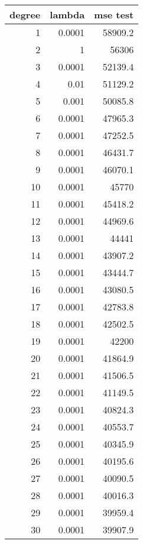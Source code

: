 \begin{tabular}{rrr}
\hline
   degree &   lambda &   mse test \\
\hline
        1 &   0.0001 &    58909.2 \\
        2 &   1      &    56306   \\
        3 &   0.0001 &    52139.4 \\
        4 &   0.01   &    51129.2 \\
        5 &   0.001  &    50085.8 \\
        6 &   0.0001 &    47965.3 \\
        7 &   0.0001 &    47252.5 \\
        8 &   0.0001 &    46431.7 \\
        9 &   0.0001 &    46070.1 \\
       10 &   0.0001 &    45770   \\
       11 &   0.0001 &    45418.2 \\
       12 &   0.0001 &    44969.6 \\
       13 &   0.0001 &    44441   \\
       14 &   0.0001 &    43907.2 \\
       15 &   0.0001 &    43444.7 \\
       16 &   0.0001 &    43080.5 \\
       17 &   0.0001 &    42783.8 \\
       18 &   0.0001 &    42502.5 \\
       19 &   0.0001 &    42200   \\
       20 &   0.0001 &    41864.9 \\
       21 &   0.0001 &    41506.5 \\
       22 &   0.0001 &    41149.5 \\
       23 &   0.0001 &    40824.3 \\
       24 &   0.0001 &    40553.7 \\
       25 &   0.0001 &    40345.9 \\
       26 &   0.0001 &    40195.6 \\
       27 &   0.0001 &    40090.5 \\
       28 &   0.0001 &    40016.3 \\
       29 &   0.0001 &    39959.4 \\
       30 &   0.0001 &    39907.9 \\
\hline
\end{tabular}